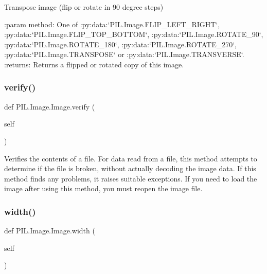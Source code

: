 \begin{DoxyVerb}Transpose image (flip or rotate in 90 degree steps)

:param method: One of :py:data:`PIL.Image.FLIP_LEFT_RIGHT`,
  :py:data:`PIL.Image.FLIP_TOP_BOTTOM`, :py:data:`PIL.Image.ROTATE_90`,
  :py:data:`PIL.Image.ROTATE_180`, :py:data:`PIL.Image.ROTATE_270`,
  :py:data:`PIL.Image.TRANSPOSE` or :py:data:`PIL.Image.TRANSVERSE`.
:returns: Returns a flipped or rotated copy of this image.
\end{DoxyVerb}
 \mbox{\label{classPIL_1_1Image_1_1Image_a1efe68d128efa7604d8972e13101461c}} 
\subsubsection{\texorpdfstring{verify()}{verify()}}
{\footnotesize\ttfamily def P\+I\+L.\+Image.\+Image.\+verify (\begin{DoxyParamCaption}\item[{}]{self }\end{DoxyParamCaption})}

\begin{DoxyVerb}Verifies the contents of a file. For data read from a file, this
method attempts to determine if the file is broken, without
actually decoding the image data.  If this method finds any
problems, it raises suitable exceptions.  If you need to load
the image after using this method, you must reopen the image
file.
\end{DoxyVerb}
 \mbox{\label{classPIL_1_1Image_1_1Image_a7b24041e769b1371ee37a0509c74e4aa}} 
\subsubsection{\texorpdfstring{width()}{width()}}
{\footnotesize\ttfamily def P\+I\+L.\+Image.\+Image.\+width (\begin{DoxyParamCaption}\item[{}]{self }\end{DoxyParamCaption})}



